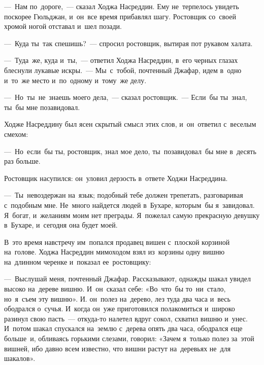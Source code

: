 \documentclass[12pt,a4paper]{book}
\begin{document}
—~Нам по~дороге,~— сказал Ходжа Насреддин. Ему не~терпелось увидеть поскорее Гюльджан, и~он~все время прибавлял шагу. Ростовщик со~своей хромой ногой отставал и~шел позади.

—~Куда ты~так спешишь?~— спросил ростовщик, вытирая пот рукавом халата.

—~Туда~же, куда и~ты,~— ответил Ходжа Насреддин, в~его черных глазах блеснули лукавые искры.~— Мы~с~тобой, почтенный Джафар, идем в~одно и~то~же место и~по~одному и~тому~же делу.

—~Но~ты~не~знаешь моего дела,~— сказал ростовщик.~— Если~бы ты~знал, ты~бы мне позавидовал.

Ходже Насреддину был ясен скрытый смысл этих слов, и~он~ответил с~веселым смехом:

—~Но~если~бы ты, ростовщик, знал мое дело, ты~позавидовал~бы мне в~десять раз больше.

Ростовщик насупился: он~уловил дерзость в~ответе Ходжи Насреддина.

—~Ты~невоздержан на~язык; подобный тебе должен трепетать, разговаривая с~подобным мне. Не~много найдется людей в~Бухаре, которым~бы я~завидовал. Я~богат, и~желаниям моим нет преграды. Я~пожелал самую прекрасную девушку в~Бухаре, и~сегодня она будет моей.

В~это время навстречу им~попался продавец вишен с~плоской корзиной на~голове. Ходжа Насреддин мимоходом взял из~корзины одну вишню на~длинном черенке и~показал ее~ростовщику:

—~Выслушай меня, почтенный Джафар. Рассказывают, однажды шакал увидел высоко на~дереве вишню. И~он~сказал себе: «Во~что~бы то~ни~стало, но~я~съем эту вишню». И. он~полез на~дерево, лез туда два часа и~весь ободрался о~сучья. И~когда он~уже приготовился полакомиться и~широко разинул свою пасть~— откуда-то налетел вдруг сокол, схватил вишню и~унес. И~потом шакал спускался на~землю с~дерева опять два часа, ободрался еще больше~и, обливаясь горькими слезами, говорил: «Зачем я~только полез за~этой вишней, ибо давно всем известно, что вишни растут на~деревьях не~для шакалов».
\end{document}

